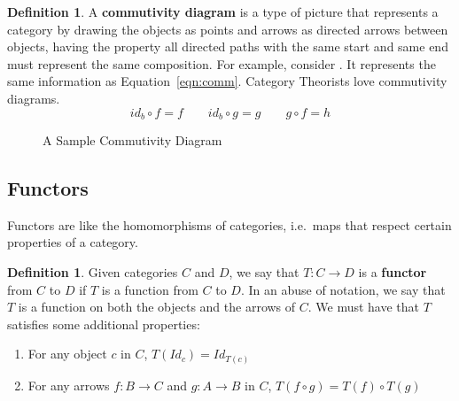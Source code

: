 \documentclass[14pt]{extarticle}  %
\theoremstyle{plain}
\theoremstyle{definition}
\newtheorem{defn}[thm]{Definition}
\theoremstyle{remark}
\begin{document}
\begin{defn}
  A \textbf{commutivity diagram} is a type of picture that represents a category by drawing the objects as points and arrows as directed arrows between objects, having the property all directed
  paths with the same start and same end must represent the same composition. For example, consider . It represents the same information as Equation~\ref{eqn:comm}.
  Category Theorists love commutivity diagrams.
  \begin{equation}\label{eqn:comm}
    id_{b} \circ f = f \qquad id_{b} \circ g = g \qquad g \circ f = h
\end{equation}



  \begin{figure}[h]
\centering
\caption{A Sample Commutivity Diagram}
\label{fig:commdia}
\end{figure}
\end{defn}


\subsection{Functors}
Functors are like the homomorphisms of categories, i.e.\ maps that respect certain properties of a category.

\begin{defn}
  Given categories $C$ and $D$, we say that $T : C \to D$ is a \textbf{functor} from $C$ to $D$ if $T$ is a function from $C$ to $D$.
  In an abuse of notation, we say that $T$ is a function on both the objects and the arrows of $C$.
  We must have that $T$ satisfies some additional properties:
  \begin{enumerate}
    \item For any object $c$ in $C$, $T(Id_{c}) = Id_{T(c)}$
          \item For any arrows $f : B \to C$ and $g : A \to B$ in $C$, $T(f \circ g) = T(f) \circ T(g)$
    \end{enumerate}
\end{defn}
\end{document}

